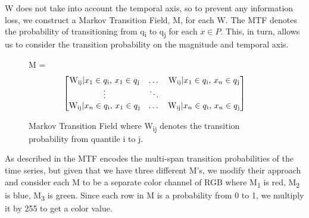 \documentclass{turabian-thesis}
\begin{document}

W does not take into account the temporal axis, so to prevent any information loss, we construct a Markov Transition Field, M, for each W. The MTF denotes the probability of transitioning from q\textsubscript{i} to q\textsubscript{j} for each $x \in P$. This, in turn, allows us to consider the transition probability on the magnitude and temporal axis.

\begin{figure}[h!]
  \centering
  M =
  \[\begin{bmatrix}

  \text{W\textsubscript{ij}} | \text{$x\textsubscript{1} \in q\textsubscript{i}$, $x_{1} \in q\textsubscript{j}$}
  & \dots &
  
  \text{W\textsubscript{ij}}  |  \text{$x_{1} \in q\textsubscript{i}$, $x_{n} \in q\textsubscript{j}$} 
  
  \\
  
  \vdots &  \ddots & \\
  
  \text{W\textsubscript{ij}} | \text{$x_{n} \in q\textsubscript{i}$, $x_{1} \in q\textsubscript{j}$}
  & \dots &
  \text{W\textsubscript{ij}} | \text{$x_{n} \in q\textsubscript{i}$, $x_{n} \in q\textsubscript{j}$} \\
  
  
  \end{bmatrix}\]
  \caption{Markov Transition Field where  W\textsubscript{ij} denotes the transition probability from quantile i to j.}
  \label{fig:mtf}
\end{figure}

As described in \cite{wang_encoding_nodate} the MTF encodes the multi-span transition probabilities of the time series, but given that we have three different M's, we modify their approach and consider each M to be a separate color channel of RGB where M\textsubscript{1} is red, M\textsubscript{2} is blue, M\textsubscript{3} is green. Since each row in M is a probability from 0 to 1, we multiply it by 255 to get a color value.
\end{document}
